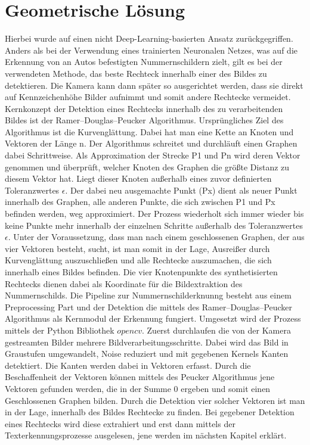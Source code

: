 \section{Geometrische Lösung}
Hierbei wurde auf einen nicht Deep-Learning-basierten Ansatz zurückgegriffen. Anders als bei der Verwendung eines trainierten Neuronalen Netzes, was auf die Erkennung von an Autos befestigten Nummernschildern zielt, gilt es bei der verwendeten Methode, das beste Rechteck innerhalb einer des Bildes zu detektieren. Die Kamera kann dann später so ausgerichtet werden, dass sie direkt auf Kennzeichenhöhe Bilder aufnimmt und somit andere Rechtecke vermeidet.
Kernkonzept der Detektion eines Rechtecks innerhalb des zu verarbeitenden Bildes ist der Ramer–Douglas–Peucker Algorithmus. Ursprüngliches Ziel des Algorithmus ist die Kurvenglättung. Dabei hat man eine Kette an Knoten und Vektoren der Länge n. Der Algorithmus schreitet und durchläuft einen Graphen dabei Schrittweise. Als Approximation der Strecke P1 und Pn wird deren Vektor genommen und überprüft, welcher Knoten des Graphen die größte Distanz zu diesem Vektor hat. Liegt dieser Knoten außerhalb eines zuvor definierten Toleranzwertes $\epsilon$. %
Der dabei neu ausgemachte Punkt (Px) dient als neuer Punkt innerhalb des Graphen, alle anderen Punkte, die sich zwischen P1 und Px befinden werden, weg approximiert. Der Prozess wiederholt sich immer wieder bis keine Punkte mehr innerhalb der einzelnen Schritte außerhalb des Toleranzwertes $\epsilon$.\autocite[Vgl.][]{hershberger1992speeding} 
Unter der Voraussetzung, dass man nach einem geschlossenen Graphen, der aus vier Vektoren besteht, sucht, ist man somit in der Lage, Ausreißer durch Kurvenglättung auszuschließen und alle Rechtecke auszumachen, die sich innerhalb eines Bildes befinden. Die vier Knotenpunkte des synthetisierten Rechtecks dienen dabei als Koordinate für die Bildextraktion des Nummernschilds. %
Die Pipeline zur Nummernschilderknunng besteht aus einem Preprocessing Part und der Detektion die mittels des Ramer–Douglas–Peucker Algorithmus als Kernmodul der Erkennung fungiert. Umgesetzt wird der Prozess mittels der Python Bibliothek $opencv$. Zuerst durchlaufen die von der Kamera gestreamten Bilder mehrere Bildverarbeitungsschritte. Dabei wird das Bild in Graustufen umgewandelt, Noise reduziert und  mit gegebenen Kernels Kanten detektiert. %
 Die Kanten werden dabei in Vektoren erfasst. Durch die Beschaffenheit der Vektoren können mittels des Peucker Algorithmus jene Vektoren gefunden werden, die in der Summe 0 ergeben und somit einen Geschlossenen Graphen bilden. Durch die Detektion vier solcher Vektoren ist man in der Lage, innerhalb des Bildes Rechtecke zu finden. Bei gegebener Detektion eines Rechtecks wird diese extrahiert und erst dann mittels der Texterkennungsprozesse ausgelesen, jene werden im nächsten Kapitel erklärt. 









